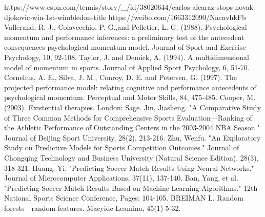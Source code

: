 \documentclass[12pt]{article}  %
\begin{document}
\clearpage   %
\begin{thebibliography}{99}
     https://www.espn.com/tennis/story/\_/id/38020644/carlos-alcaraz-stops-novak-djokovic-win-1st-wimbledon-title
	 https://weibo.com/1663312090/NacnvhkFb
	 Vallerand, R. J., Colavecchio, P. G.,and Pelletier, L. G. (1988). Psychological momentum and performance inferences: a preliminary test of the antecedent consequences psychological momentum model. Journal of Sport and Exercise Psychology, 10, 92-108.
	 Taylor, J. and Demick, A. (1994). A multidimensional model of momentum in sports. Journal of Applied Sport Psychology, 6, 51-70.
	 Cornelius, A. E., Silva, J. M., Conroy, D. E. and Petersen, G. (1997). The projected performance model: relating cognitive and performance antecedents of psychological momentum. Perceptual and Motor Skills, 84, 475-485.
	 Cooper, M. (2003). Existential therapies. London: Sage.
	Jin, Jiasheng. "A Comparative Study of Three Common Methods for Comprehensive Sports Evaluation—Ranking of the Athletic Performance of Outstanding Centers in the 2003-2004 NBA Season." Journal of Beijing Sport University, 28(2), 213-216.
	Zhu, Wenfu. "An Exploratory Study on Predictive Models for Sports Competition Outcomes." Journal of Chongqing Technology and Business University (Natural Science Edition), 28(3), 318-321.
	Huang, Yi. "Predicting Soccer Match Results Using Neural Networks." Journal of Microcomputer Applications, 37(11), 137-140.
	 Ban, Yang, et al. "Predicting Soccer Match Results Based on Machine Learning Algorithms." 12th National Sports Science Conference, Pages: 104-105.
	 BREIMAN L. Random forests—random features. Macyidc Leamina, 45(1) 5-32.
\end{thebibliography}
%  
\end{document}
